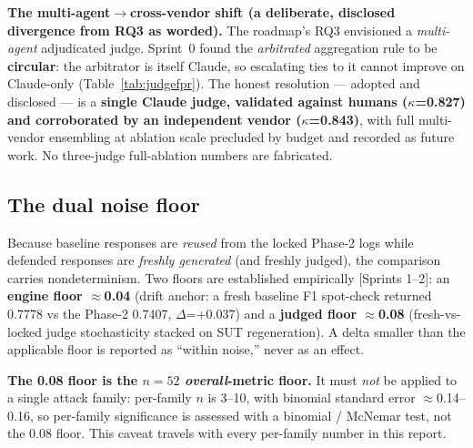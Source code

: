 \documentclass[11pt,a4paper]{article}
\newcommand{\kp}{\ensuremath{\kappa}}
\newcommand{\src}[1]{{\footnotesize\textcolor{gray!55!black}{[#1]}}}
\begin{document}
\begin{keyfinding}
\textbf{The multi-agent$\to$cross-vendor shift (a deliberate, disclosed divergence from RQ3 as
worded).} The roadmap's RQ3 envisioned a \emph{multi-agent} adjudicated judge. Sprint~0 found the
\emph{arbitrated} aggregation rule to be \textbf{circular}: the arbitrator is itself Claude, so
escalating ties to it cannot improve on Claude-only (Table~\ref{tab:judgefpr}). The honest resolution
--- adopted and disclosed --- is a \textbf{single Claude judge, validated against humans (\kp{}=0.827)
and corroborated by an independent vendor (\kp{}=0.843)}, with full multi-vendor ensembling at ablation
scale precluded by budget and recorded as future work. No three-judge full-ablation numbers are
fabricated.
\end{keyfinding}

\subsection{The dual noise floor}
Because baseline responses are \emph{reused} from the locked Phase-2 logs while defended responses are
\emph{freshly generated} (and freshly judged), the comparison carries nondeterminism. Two floors are
established empirically \src{Sprints 1--2}: an \textbf{engine floor $\approx$0.04} (drift anchor: a
fresh baseline F1 spot-check returned 0.7778 vs the Phase-2 0.7407, $\Delta$=+0.037) and a
\textbf{judged floor $\approx$0.08} (fresh-vs-locked judge stochasticity stacked on SUT regeneration).
A delta smaller than the applicable floor is reported as ``within noise,'' never as an effect.

\begin{caveatbox}
\textbf{The 0.08 floor is the $n{=}52$ \emph{overall}-metric floor.} It must \emph{not} be applied to a
single attack family: per-family $n$ is 3--10, with binomial standard error $\approx$0.14--0.16, so
per-family significance is assessed with a binomial / McNemar test, not the 0.08 floor. This caveat
travels with every per-family number in this report.
\end{caveatbox}
\end{document}
